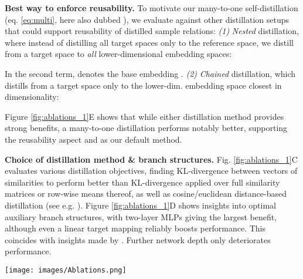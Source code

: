 \documentclass{article} \usepackage{arxiv_style,times}
\begin{document}
\textbf{Best way to enforce reusability.} To motivate our many-to-one self-distillation  (eq. \ref{eq:multi}, here also dubbed ), we evaluate against other distillation setups that could support reusability of distilled sample relations: 
\textit{(1)} \textit{Nested} distillation, where instead of distilling all target spaces only to the reference space, we distill from a target space to \textit{all} lower-dimensional embedding spaces:

In the second term,  denotes the base embedding . 
\textit{(2)} \textit{Chained} distillation, which distills from a target space only to the lower-dim. embedding space closest in dimensionality:

Figure \ref{fig:ablations_1}E shows that while either distillation method provides strong benefits, a many-to-one distillation performs notably better, supporting the reusability aspect and  as our default method.

\textbf{Choice of distillation method \& branch structures.} Fig.  \ref{fig:ablations_1}C evaluates various distillation objectives, finding KL-divergence between vectors of similarities to perform better than KL-divergence applied over full similarity matrices or row-wise means thereof, as well as cosine/euclidean distance-based distillation (see e.g. \citep{Yu_2019}). 
Figure \ref{fig:ablations_1}D shows insights into optimal auxiliary branch structures, with two-layer MLPs giving the largest benefit, although even a linear target mapping reliably boosts performance. This coincides with insights made by \cite{chen2020simple}. Further network depth only deteriorates performance.  


\begin{figure*}[t]
    \centering
    \texttt{[image: images/Ablations.png]}
    \caption{\textit{S2SD study and ablations.} \textbf{(A)} \textit{DSD} outperforms comparable two-stage distillation on student \textit{S} (\textit{Dist.}) using teacher (\textit{T}), with \textit{MSD(FA)} even outperforming \textit{T}. We further see that distillation is essential - training multiple spaces in parallel (\textit{Joint.}) or a detached lower-dimensional base embedding (\textit{Concur.}) gives little benefit. \textbf{(B)} We see benefits across base dimensionalities, especially in the low-dimensional regime. \textbf{(C)} We find KL-distillation between similarity vectors (\textit{R-KL}) to work best. \textbf{(D)} An additional non-linearity in aux. branches  gives a boost, but going deeper hurts generalization. \textbf{(E)} Distilling each aux. embed. space (\textit{Multi}) separately compares favourable against other distillation setups s.a. \textit{Nested} and \textit{Chained} distillation. \textbf{(F)} Performance is robust to changes in weight values.}
    \label{fig:ablations_1}
\end{figure*}
\end{document}
